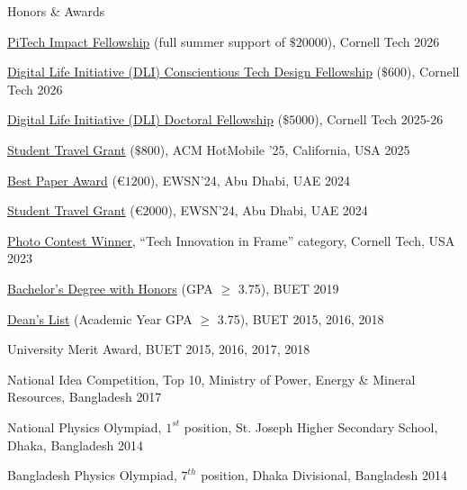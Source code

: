 \documentclass{resume} %
\begin{document}
\begin{rSection}{Honors \& Awards}
\begin{rSubsection}{}{}{}{}
\item \href{https://www.pi.tech.cornell.edu/pitech-phd-impact-fellowship}{PiTech Impact Fellowship} (full summer support of $\$20000$), Cornell Tech \hfill 2026
\item \href{https://conscientious.tech.cornell.edu/}{Digital Life Initiative (DLI) Conscientious Tech Design Fellowship}  ($\$600$), Cornell Tech \hfill 2026
\item \href{https://dli.tech.cornell.edu/doctoralfellows}{Digital Life Initiative (DLI) Doctoral Fellowship}  ($\$5000$), Cornell Tech \hfill 2025-26
\item  \href{https://drive.google.com/file/d/1gfs4tNu51YIe8am-U1HK8uWKA8UiC61-/view?usp=sharing}{Student Travel Grant} ($\$800$), ACM HotMobile '25, California, USA \hfill 2025
\item  \href{https://drive.google.com/file/d/1_GY4MncZnoOWJWAwxJllXX3saXhG9irn/view?usp=sharing}{Best Paper Award}  (\euro $1200$), EWSN'24, Abu Dhabi, UAE \hfill 2024
\item \href{https://drive.google.com/file/d/1_GY4MncZnoOWJWAwxJllXX3saXhG9irn/view?usp=sharing}{Student Travel Grant}  (\euro $2000$), EWSN'24, Abu Dhabi, UAE \hfill 2024
\item  \href{https://drive.google.com/file/d/15SWDxWEmWTwl6eiqXWZQhTW7JMe86Xfq/view?usp=sharing}{Photo Contest Winner}, ``Tech Innovation in Frame'' category, Cornell Tech, USA \hfill {2023}
\item  \href{https://cse.buet.ac.bd/academics/fund}{Bachelor's Degree with Honors} (GPA $\geq$ 3.75), BUET \hfill {2019}
\item  \href{https://cse.buet.ac.bd/academics/fund}{Dean’s List} (Academic Year GPA $\geq$ 3.75), BUET \hfill {2015, 2016, 2018}
\item University Merit Award, BUET \hfill {2015, 2016, 2017, 2018}
\item { National Idea Competition}, {Top 10}, Ministry of Power, Energy \& Mineral Resources, Bangladesh \hfill { 2017}
\item { National Physics Olympiad}, {\bf \textit{$1^{st}$}} position,  St. Joseph Higher Secondary School, Dhaka, Bangladesh \hfill{2014}
\item { Bangladesh Physics Olympiad}, {\bf \textit{$7^{th}$}} position, Dhaka Divisional, Bangladesh \hfill {2014}
\end{rSubsection}

\end{rSection}
\end{document}
